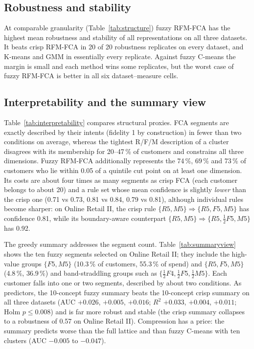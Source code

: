 \subsection{Robustness and stability}\label{sec:res-struct}



At comparable granularity (Table~\ref{tab:structure}) fuzzy RFM-FCA has the highest mean robustness and stability of all representations on all three datasets. It beats crisp RFM-FCA in 20 of 20 robustness replicates on every dataset, and K-means and GMM in essentially every replicate. Against fuzzy C-means the margin is small and each method wins some replicates, but the worst case of fuzzy RFM-FCA is better in all six dataset--measure cells.

\subsection{Interpretability and the summary view}\label{sec:res-interp}



Table~\ref{tab:interpretability} compares structural proxies. FCA segments are exactly described by their intents (fidelity 1 by construction) in fewer than two conditions on average, whereas the tightest R/F/M description of a cluster disagrees with its membership for 20--47\,\% of customers and constrains all three dimensions. Fuzzy RFM-FCA additionally represents the 74\,\%, 69\,\% and 73\,\% of customers who lie within 0.05 of a quintile cut point on at least one dimension. Its costs are about four times as many segments as crisp FCA (each customer belongs to about 20) and a rule set whose mean confidence is slightly \emph{lower} than the crisp one (0.71 vs 0.73, 0.81 vs 0.84, 0.79 vs 0.81), although individual rules become sharper: on Online Retail II, the crisp rule $\{R5, M5\} \Rightarrow \{R5, F5, M5\}$ has confidence 0.81, while its boundary-aware counterpart $\{R5, M5\} \Rightarrow \{R5, \tfrac12 F5, M5\}$ has 0.92.



The greedy summary addresses the segment count. Table~\ref{tab:summaryview} shows the ten fuzzy segments selected on Online Retail II; they include the high-value groups $\{F5, M5\}$ (10.3\,\% of customers, 55.3\,\% of spend) and $\{R5, F5, M5\}$ (4.8\,\%, 36.9\,\%) and band-straddling groups such as $\{\tfrac12 F4, \tfrac12 F5, \tfrac12 M5\}$. Each customer falls into one or two segments, described by about two conditions. As predictors, the 10-concept fuzzy summary beats the 10-concept crisp summary on all three datasets (AUC $+0.026$, $+0.005$, $+0.016$; $R^2$ $+0.033$, $+0.004$, $+0.011$; Holm $p \le 0.008$) and is far more robust and stable (the crisp summary collapses to a robustness of 0.57 on Online Retail II). Compression has a price: the summary predicts worse than the full lattice and than fuzzy C-means with ten clusters (AUC $-0.005$ to $-0.047$).

